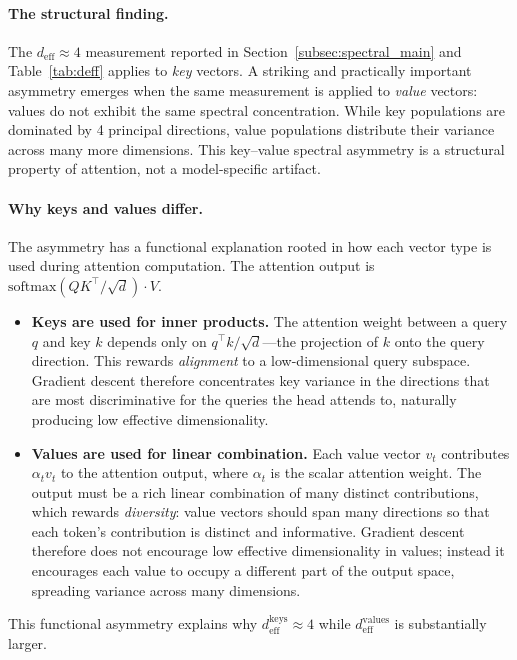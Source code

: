 \documentclass[11pt]{article}
\newcommand{\deff}{d_{\mathrm{eff}}}
\begin{document}
\paragraph{The structural finding.}
The $\deff \approx 4$ measurement reported in Section~\ref{subsec:spectral_main}
and Table~\ref{tab:deff} applies to \emph{key} vectors.  A striking and
practically important asymmetry emerges when the same measurement is applied
to \emph{value} vectors: values do not exhibit the same spectral concentration.
While key populations are dominated by 4 principal directions, value
populations distribute their variance across many more dimensions.  This
key--value spectral asymmetry is a structural property of attention, not a
model-specific artifact.

\paragraph{Why keys and values differ.}
The asymmetry has a functional explanation rooted in how each vector type is
used during attention computation.  The attention output is
$\mathrm{softmax}(QK^\top / \sqrt{d}) \cdot V$.
\begin{itemize}[leftmargin=2em]
  \item \textbf{Keys are used for inner products.}  The attention weight between
    a query $q$ and key $k$ depends only on $q^\top k / \sqrt{d}$---the
    projection of $k$ onto the query direction.  This rewards
    \emph{alignment} to a low-dimensional query subspace.  Gradient descent
    therefore concentrates key variance in the directions that are most
    discriminative for the queries the head attends to, naturally producing
    low effective dimensionality.
  \item \textbf{Values are used for linear combination.}  Each value vector
    $v_t$ contributes $\alpha_t v_t$ to the attention output, where $\alpha_t$
    is the scalar attention weight.  The output must be a rich linear
    combination of many distinct contributions, which rewards
    \emph{diversity}: value vectors should span many directions so that
    each token's contribution is distinct and informative.  Gradient descent
    therefore does not encourage low effective dimensionality in values;
    instead it encourages each value to occupy a different part of the output
    space, spreading variance across many dimensions.
\end{itemize}
This functional asymmetry explains why $\deff^{\mathrm{keys}} \approx 4$ while
$\deff^{\mathrm{values}}$ is substantially larger.
\end{document}
